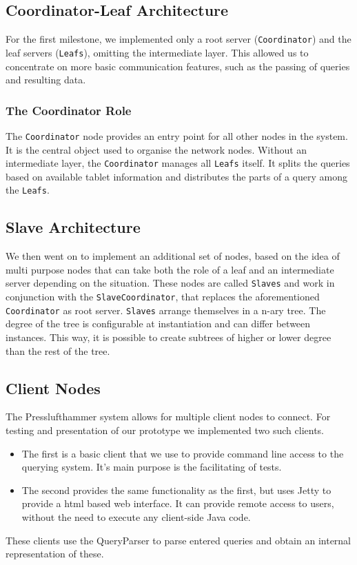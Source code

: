   \subsection{Coordinator-Leaf Architecture}
    For the first milestone, we implemented only a root server
    (\texttt{Coordinator}) and the leaf servers (\texttt{Leafs}),
    omitting the intermediate layer.
    This allowed us to concentrate on more basic communication features,
    such as the passing of queries and resulting data.
    \subsubsection{The Coordinator Role}
      The \texttt{Coordinator} node provides an entry point for all other nodes
      in the system.
      It is the central object used to organise the network nodes.
      Without an intermediate layer, the \texttt{Coordinator} manages all
      \texttt{Leafs} itself. It splits the queries based on available tablet
      information and distributes the parts of a query among the \texttt{Leafs}.
    
    
  \subsection{Slave Architecture}
    We then went on to implement an additional set of nodes, based on the
    idea of multi purpose nodes that can take both the role of a leaf
    and an intermediate server depending on the situation.
    These nodes are called \texttt{Slaves} and work in conjunction with the
    \texttt{SlaveCoordinator}, that replaces the aforementioned 
    \texttt{Coordinator} as root server.
    \texttt{Slaves} arrange themselves in a n-ary tree.
    The degree of the tree is configurable at instantiation
    and can differ between instances.
    This way, it is possible to create subtrees of higher or lower degree
    than the rest of the tree.


  \subsection{Client Nodes}
    The Presslufthammer system allows for multiple client nodes to connect.
    For testing and presentation of our prototype we implemented two such
    clients.
    \begin{itemize}
      \item The first is a basic client that we use to provide command
            line access to the querying system.
            It's main purpose is the facilitating of tests.
      \item The second provides the same functionality as the first,
            but uses Jetty \cite{jetty} to provide a html based web
            interface.
            It can provide remote access to users, without the need
            to execute any client-side Java code.
    \end{itemize}
    These clients use the QueryParser to parse entered queries and obtain
    an internal representation of these.


